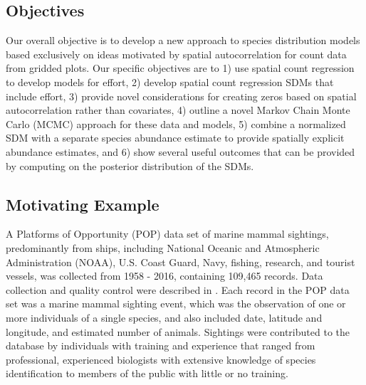 \documentclass[11pt, titlepage]{article}
\begin{document}
\begin{spacing}{1.9}
\begin{flushleft}

\subsection{Objectives} \label{sec:obj}

Our overall objective is to develop a new approach to species distribution models based exclusively on ideas motivated by spatial autocorrelation for count data from gridded plots.  Our specific objectives are to 1) use spatial count regression to develop models for effort, 2) develop spatial count regression SDMs that include effort, 3) provide novel considerations for creating zeros based on spatial autocorrelation rather than covariates, 4) outline a novel Markov Chain Monte Carlo (MCMC) approach for these data and models, 5) combine a normalized SDM with a separate species abundance estimate to provide spatially explicit abundance estimates, and 6) show several useful outcomes that can be provided by computing on the posterior distribution of the SDMs.


\subsection{Motivating Example} \label{sec:motex}

A Platforms of Opportunity (POP) data set of marine mammal sightings, predominantly from ships, including National Oceanic and Atmospheric Administration (NOAA), U.S. Coast Guard, Navy, fishing, research, and tourist vessels, was collected from 1958 - 2016, containing 109,465 records. Data collection and quality control were described in \citet{HimesBoorEtAl2012Stellersealion}. Each record in the POP data set was a marine mammal sighting event, which was the observation of one or more individuals of a single species, and also included date, latitude and longitude, and estimated number of animals. Sightings were contributed to the database by individuals with training and experience that ranged from professional, experienced biologists with extensive knowledge of species identification to members of the public with little or no training.


\end{flushleft}
\end{spacing}
\end{document}
